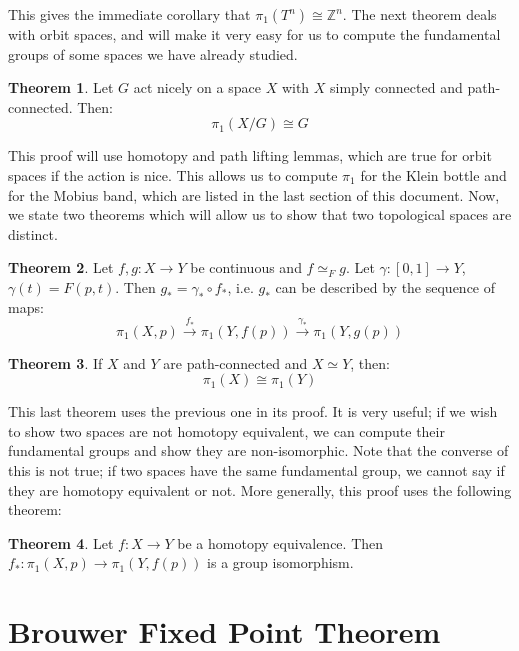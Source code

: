 \documentclass[11pt, oneside]{amsart}   	%
\theoremstyle{definition}
\newtheorem{theorem}{Theorem}[section]
\begin{document}
	This gives the immediate corollary that $\pi_1(T^n)\cong\mathbb Z^n$. The next theorem deals with orbit spaces, and will make it very easy for us to compute 
	the fundamental groups of some spaces we have already studied.
	
	\begin{theorem}
		Let $G$ act nicely on a space $X$ with $X$ simply connected and path-connected. Then:
		$$
			\pi_1(X / G)\cong G
		$$
	\end{theorem}
	
	This proof will use homotopy and path lifting lemmas, which are true for orbit spaces if the action is nice. This allows us to compute $\pi_1$ for the Klein 
	bottle and for the Mobius band, which are listed in the last section of this document. Now, we state two theorems which will allow us to show that 
	two topological spaces are distinct. 
	
	\begin{theorem}
		Let $f, g : X\rightarrow Y$ be continuous and $f\simeq_F g$. Let $\gamma : [0, 1]\rightarrow Y$, $\gamma(t) = F(p, t)$. Then $g_* = \gamma_*\circ
		f_*$, i.e. $g_*$ can be described by the sequence of maps:
		$$
			\pi_1(X, p)\xrightarrow{f_*}\pi_1(Y, f(p))\xrightarrow{\gamma_*}\pi_1(Y, g(p))
		$$
	\end{theorem}
	
	\begin{theorem}
		If $X$ and $Y$ are path-connected and $X\simeq Y$, then:
		$$
			\pi_1(X)\cong\pi_1(Y)
		$$
	\end{theorem}
	
	This last theorem uses the previous one in its proof. It is very useful; if we wish to show two spaces are not homotopy equivalent, we can compute their 
	fundamental groups and show they are non-isomorphic. Note that the converse of this is not true; if two spaces have the same fundamental group, we cannot 
	say if they are homotopy equivalent or not. More generally, this proof uses the following theorem:
	
	\begin{theorem}
		Let $f : X\rightarrow Y$ be a homotopy equivalence. Then $f_* : \pi_1(X, p)\rightarrow\pi_1(Y, f(p))$ is a group isomorphism.
	\end{theorem}

\section{Brouwer Fixed Point Theorem}
	
\end{document}

